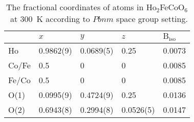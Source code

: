 \documentclass[12pt,twocolumns]{iopart}
\newcommand{\HFCO}{Ho$_2$FeCoO$_6$}
\begin{document}
\begin{center}
	\begin{table}[!b]
		\setlength{\tabcolsep}{10pt}
		\caption{The fractional coordinates of atoms in \HFCO\ at 300~K according to $Pbnm$ space group setting.
			\label{tab:str}
			}
		\centering
		\begin{tabular}{l|llll}   \hline
			& $x$          & $y$             & $z$                  & $\mathrm{B_{iso}}$               \\ 
			\hline\hline
			Ho        & 0.9862(9)       & 0.0689(5)          & 0.25               &   0.0073             \\
			Co/Fe        & 0.5            & 0             & 0                    &   0.0085             \\
			Fe/Co        & 0.5          & 0               & 0                    &   0.0085             \\
			O(1)      & 0.0995(9)       & 0.4724(9)          & 0.25               &    0.0136            \\
			O(2)      & 0.6943(8)       & 0.2994(8)          & 0.0526(5)               & 0.0147               \\ \hline\hline
		\end{tabular}
	\end{table}
\end{center}
\clearpage\newpage
\end{document}
